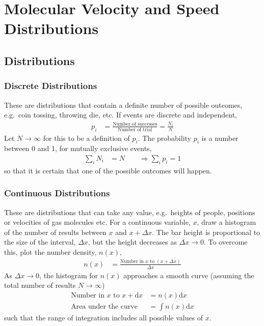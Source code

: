 \documentclass[british]{article}
\renewcommand{\d}{\mathrm{d}} %
\begin{document}
\section{Molecular Velocity and Speed Distributions}
\subsection{Distributions}
\subsubsection{Discrete Distributions}

These are distributions that contain a definite number of possible outcomes, e.g.\ coin tossing, throwing die, etc. If events are discrete and independent, 
\begin{align*}
p_{i} & =\frac{\text{Number of successes}}{\text{Number of trial}}=\frac{N_{i}}{N}
\end{align*}
Let $N\rightarrow\infty$ for this to be a definition of $p_{i}$. The probability $p_{i}$ is a number between 0 and 1, for mutually exclusive events, 
\begin{align*}
\sum_{i}N_{i} & =N\qquad\Rightarrow\sum_{i}p_{i}=1
\end{align*}
so that it is certain that one of the possible outcomes will happen.


\subsubsection{Continuous Distributions}

These are distributions that can take any value, e.g.\ heights of people, positions or velocities of gas molecules etc. For a continuous variable, $x$, draw a histogram of the number of results between
$x$ and $x+\Delta x$. The bar height is proportional to the size of the interval, $\Delta x$, but the height decreases as $\Delta x\rightarrow0$. To overcome this, plot the number density, $n(x)$, 
\begin{align*}
n(x) & =\frac{\text{Number in }x\text{ to }(x+\Delta x)}{\Delta x}
\end{align*}
As $\Delta x\rightarrow0$, the histogram for $n(x)$ approaches a smooth curve (assuming the total number of results $N\rightarrow\infty$)
\begin{align*}
\text{Number in }x\text{ to }x+\d{x} & =n(x)\d{x}\\
\text{Area under the curve} & =\int n(x)\d{x}
\end{align*}
such that the range of integration includes all possible values of $x$.
\end{document}
